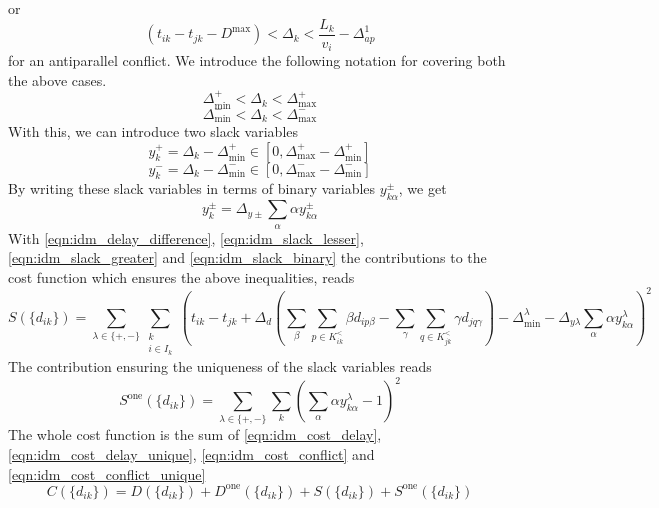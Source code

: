 \documentclass{article}
\begin{document}
or
\begin{equation*} \label{eqn:idm_slack_lesser_antiparallel}
     (t_{ik} - t_{jk} - D^{\text{max}}) < \Delta_k < \frac{L_k}{v_i} - \Delta^1_{ap}
\end{equation*}
for an antiparallel conflict.
We introduce the following notation for covering both the above cases.
\begin{equation*} \label{eqn:idm_slack_greater}
    \Delta^+_\text{min} < \Delta_k < \Delta^+_\text{max}
\end{equation*}
\begin{equation*} \label{eqn:idm_slack_lesser}
    \Delta^-_\text{min} < \Delta_k < \Delta^-_\text{max}
\end{equation*}
With this, we can introduce two slack variables
\begin{equation} \label{eqn:idm_slack_greater}
    y^+_k =  \Delta_k - \Delta^+_\text{min} \in [0, \Delta^+_\text{max} - \Delta^+_\text{min}]
\end{equation}
\begin{equation} \label{eqn:idm_slack_lesser}
    y^-_k =  \Delta_k - \Delta^-_\text{min} \in [0, \Delta^-_\text{max} - \Delta^-_\text{min}]
\end{equation}
By writing these slack variables in terms of binary variables $y^\pm_{k\alpha}$, we get
\begin{equation} \label{eqn:idm_slack_binary}
    y^\pm_k = \Delta_{y\pm} \sum_\alpha \alpha y^\pm_{k\alpha}
\end{equation}
With \eqref{eqn:idm_delay_difference}, \eqref{eqn:idm_slack_lesser}, \eqref{eqn:idm_slack_greater} and \eqref{eqn:idm_slack_binary} the contributions to the cost function which ensures the above inequalities, reads
\begin{equation} \label{eqn:idm_cost_conflict}
    S(\{d_{ik}\})  = \sum_{\lambda \in \{+, -\}} \sum_{\substack{k\\i\in I_k}} \left( t_{ik} - t_{jk} + \Delta_d \left( \sum_\beta \sum_{p\in K^<_{ik}} \beta d_{ip\beta}  - \sum_\gamma \sum_{q\in K^<_{jk}} \gamma d_{jq\gamma} \right) - \Delta^\lambda_\text{min} - \Delta_{y\lambda} \sum_\alpha \alpha y^\lambda_{k\alpha} \right)^2
\end{equation}
The contribution ensuring the uniqueness of the slack variables reads
\begin{equation} \label{eqn:idm_cost_conflict_unique}
    S^\text{one}(\{d_{ik}\})  = \sum_{\lambda \in \{+, -\}} \sum_k \left( \sum_\alpha \alpha y^\lambda_{k\alpha} - 1 \right)^2
\end{equation}
The whole cost function is the sum of \eqref{eqn:idm_cost_delay}, \eqref{eqn:idm_cost_delay_unique}, \eqref{eqn:idm_cost_conflict} and \eqref{eqn:idm_cost_conflict_unique}
\begin{equation*}
    C(\{d_{ik}\})  = D(\{d_{ik}\}) + D^\text{one}(\{d_{ik}\}) + S(\{d_{ik}\}) + S^\text{one}(\{d_{ik}\})
\end{equation*}
\end{document}
